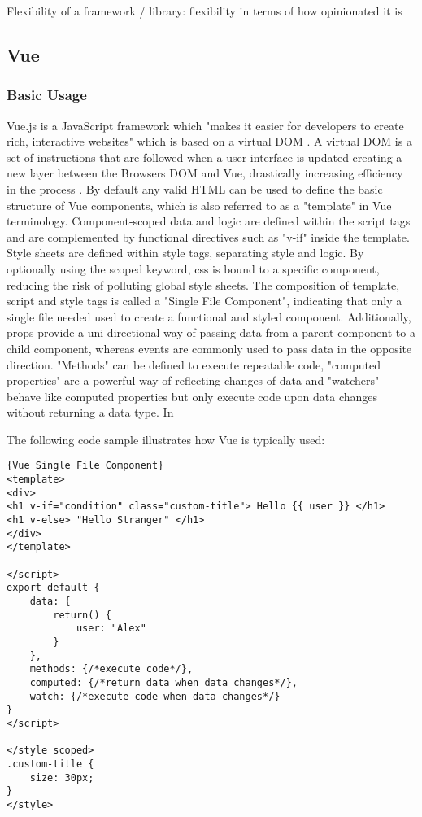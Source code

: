 Flexibility of a framework / library: flexibility in terms of how opinionated it is


\subsection{Vue}

\subsubsection{Basic Usage}
Vue.js is a JavaScript framework which "makes it easier for developers to create rich, interactive websites" \cite{macrae2018vue} which is based on a virtual DOM \cite{ComparisonVue:online}. A virtual DOM is a set of instructions that are followed when a user interface is updated \cite[p.~81]{LearningReactBanks:book} creating a new layer between the Browsers DOM and Vue, drastically increasing efficiency in the process \cite{LearningReactBanks:book}. By default any valid HTML can be used to define the basic structure of Vue components, which is also referred to as a "template" in Vue terminology. Component-scoped data and logic are defined within the script tags and are complemented by functional directives such as "v-if" inside the template. Style sheets are defined within style tags, separating style and logic. By optionally using the scoped keyword, css is bound to a specific component, reducing the risk of polluting global style sheets. The composition of template, script and style tags is called a "Single File Component", indicating that only a single file needed used to create a functional and styled component. Additionally, props provide a uni-directional way of passing data from a parent component to a child component, whereas events are commonly used to pass data in the opposite direction. "Methods" can be defined to execute repeatable code, "computed properties" are a powerful way of reflecting changes of data and "watchers" behave like computed properties but only execute code upon data changes without returning a data type. In


The following code sample illustrates how Vue is typically used: \newline
\begin{lstlisting}[caption=Vue Template, captionpos=b, style=htmlcssjs]{Vue Single File Component}
<template>
<div>
<h1 v-if="condition" class="custom-title"> Hello {{ user }} </h1>
<h1 v-else> "Hello Stranger" </h1>
</div>
</template>

</script>
export default {
    data: {
        return() {
            user: "Alex"
        }
    },
    methods: {/*execute code*/},
    computed: {/*return data when data changes*/},
    watch: {/*execute code when data changes*/}
}
</script>

</style scoped>
.custom-title {
    size: 30px;
}
</style>
\end{lstlisting}


